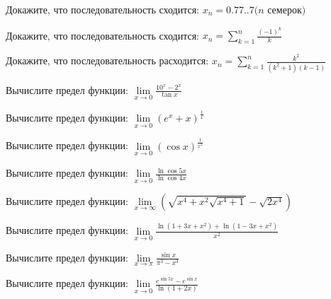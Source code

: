 \documentclass[russian]{article}
\begin{document}
Докажите, что последовательность сходится:
$x_n = 0.77..7 \text{($n$ семерок)}$

Докажите, что последовательность сходится:
$x_n = \sum_{k = 1}^n \frac{(-1)^k}{k}$

Докажите, что последовательность расходится:
$x_n = \sum_{k = 1}^n \frac{k^2}{(k^2 + 1)(k - 1)}$


Вычислите предел функции:
$\lim\limits_{x\to 0} \frac{10^x - 2^x}{\tan x}$

Вычислите предел функции:
$\lim\limits_{x\to 0} (e^x + x)^\frac{1}{x}$

Вычислите предел функции:
$\lim\limits_{x\to 0} (\cos{x})^\frac{1}{x^2}$

Вычислите предел функции:
$\lim\limits_{x \to 0} \frac{\ln\cos 5x}{\ln\cos 4x}$

Вычислите предел функции:
$\lim\limits_{x \to \infty} (\sqrt{x^4 + x^2\sqrt{x^4 + 1}} - \sqrt{2x^4})$

Вычислите предел функции:
$\lim\limits_{x \to 0} \frac{\ln(1 + 3x + x^2) + \ln(1 - 3x + x^2)}{x^2}$

Вычислите предел функции:
$\lim\limits_{x \to \pi} \frac{\sin x}{\pi^3 - x^3}$

Вычислите предел функции:
$\lim\limits_{x \to 0} \frac{e^{\sin 5x} - e^{\sin x}}{\ln(1 + 2x)}$
\end{document}
